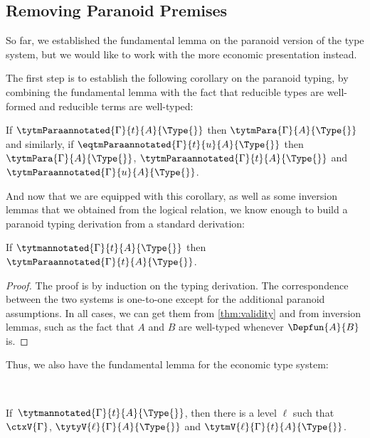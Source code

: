 \subsection{Removing Paranoid Premises}
\label{sec:remov-paran-prem}

So far, we established the fundamental lemma on the paranoid
version of the type system, but we would like to work with the more
economic presentation instead.

The first step is to establish the following corollary on the paranoid
typing, by combining the fundamental lemma with the fact that
reducible types are well-formed and reducible terms are well-typed:
%
\begin{corollary} \label{thm:validity}
  If $\tytmParaannotated{\Gamma}{t}{A}{\Type{}}$ then $\tytmPara{\Gamma}{A}{\Type{}}$ and similarly, if $\eqtmParaannotated{\Gamma}{t}{u}{A}{\Type{}}$ then
  $\tytmPara{\Gamma}{A}{\Type{}}$,
  $\tytmParaannotated{\Gamma}{t}{A}{\Type{}}$ and $\tytmParaannotated{\Gamma}{u}{A}{\Type{}}$.
\end{corollary}
%
And now that we are equipped with this corollary, as well as some
inversion lemmas that we obtained from the logical relation, we know
enough to build a paranoid typing derivation from a
standard derivation:
%
\begin{theorem}
  \label{thm:nonparanoid}
  If $\tytmannotated{\Gamma}{t}{A}{\Type{}}$ then $\tytmParaannotated{\Gamma}{t}{A}{\Type{}}$.
\end{theorem}
\begin{proof}
  The proof is by induction on the typing derivation. The
  correspondence between the two systems is one-to-one except for the
  additional paranoid assumptions.
  In all cases, we can get them from \cref{thm:validity} and from
  inversion lemmas, such as the fact that $A$ and $B$ are well-typed
  whenever $\Depfun{A}{B}$ is.
\end{proof}

Thus, we also have the fundamental lemma for the economic type system:
%
\begin{corollary}

  \

  If\, \( \tytmannotated{\Gamma}{t}{A}{\Type{}} \), then there is a level \( \ell \) such that $\ctxV{\Gamma}$,
  \( \tytyV{\ell}{\Gamma}{A}{\Type{}} \) and \( \tytmV{\ell}{\Gamma}{t}{A}{\Type{}} \).
\end{corollary}


